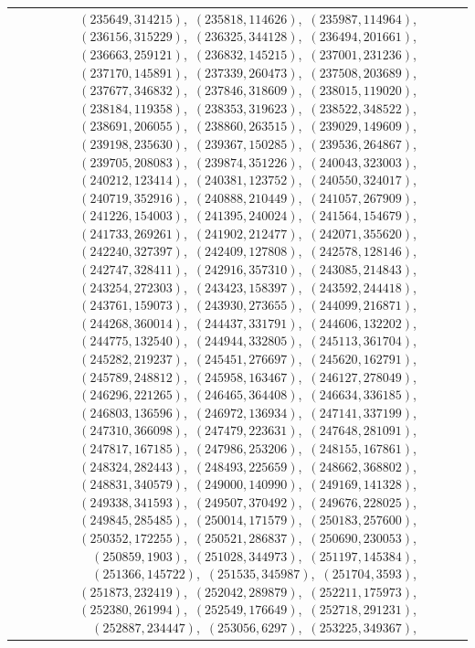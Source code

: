 \documentclass[11pt]{article}
\begin{document}
\begin{longtable}{@{}rrl>{\raggedright\arraybackslash}p{}@{}}
$(235649,314215)$,\allowbreak\ $(235818,114626)$,\allowbreak\ $(235987,114964)$,\allowbreak\ $(236156,315229)$,\allowbreak\ $(236325,344128)$,\allowbreak\ $(236494,201661)$,\allowbreak\ $(236663,259121)$,\allowbreak\ $(236832,145215)$,\allowbreak\ $(237001,231236)$,\allowbreak\ $(237170,145891)$,\allowbreak\ $(237339,260473)$,\allowbreak\ $(237508,203689)$,\allowbreak\ $(237677,346832)$,\allowbreak\ $(237846,318609)$,\allowbreak\ $(238015,119020)$,\allowbreak\ $(238184,119358)$,\allowbreak\ $(238353,319623)$,\allowbreak\ $(238522,348522)$,\allowbreak\ $(238691,206055)$,\allowbreak\ $(238860,263515)$,\allowbreak\ $(239029,149609)$,\allowbreak\ $(239198,235630)$,\allowbreak\ $(239367,150285)$,\allowbreak\ $(239536,264867)$,\allowbreak\ $(239705,208083)$,\allowbreak\ $(239874,351226)$,\allowbreak\ $(240043,323003)$,\allowbreak\ $(240212,123414)$,\allowbreak\ $(240381,123752)$,\allowbreak\ $(240550,324017)$,\allowbreak\ $(240719,352916)$,\allowbreak\ $(240888,210449)$,\allowbreak\ $(241057,267909)$,\allowbreak\ $(241226,154003)$,\allowbreak\ $(241395,240024)$,\allowbreak\ $(241564,154679)$,\allowbreak\ $(241733,269261)$,\allowbreak\ $(241902,212477)$,\allowbreak\ $(242071,355620)$,\allowbreak\ $(242240,327397)$,\allowbreak\ $(242409,127808)$,\allowbreak\ $(242578,128146)$,\allowbreak\ $(242747,328411)$,\allowbreak\ $(242916,357310)$,\allowbreak\ $(243085,214843)$,\allowbreak\ $(243254,272303)$,\allowbreak\ $(243423,158397)$,\allowbreak\ $(243592,244418)$,\allowbreak\ $(243761,159073)$,\allowbreak\ $(243930,273655)$,\allowbreak\ $(244099,216871)$,\allowbreak\ $(244268,360014)$,\allowbreak\ $(244437,331791)$,\allowbreak\ $(244606,132202)$,\allowbreak\ $(244775,132540)$,\allowbreak\ $(244944,332805)$,\allowbreak\ $(245113,361704)$,\allowbreak\ $(245282,219237)$,\allowbreak\ $(245451,276697)$,\allowbreak\ $(245620,162791)$,\allowbreak\ $(245789,248812)$,\allowbreak\ $(245958,163467)$,\allowbreak\ $(246127,278049)$,\allowbreak\ $(246296,221265)$,\allowbreak\ $(246465,364408)$,\allowbreak\ $(246634,336185)$,\allowbreak\ $(246803,136596)$,\allowbreak\ $(246972,136934)$,\allowbreak\ $(247141,337199)$,\allowbreak\ $(247310,366098)$,\allowbreak\ $(247479,223631)$,\allowbreak\ $(247648,281091)$,\allowbreak\ $(247817,167185)$,\allowbreak\ $(247986,253206)$,\allowbreak\ $(248155,167861)$,\allowbreak\ $(248324,282443)$,\allowbreak\ $(248493,225659)$,\allowbreak\ $(248662,368802)$,\allowbreak\ $(248831,340579)$,\allowbreak\ $(249000,140990)$,\allowbreak\ $(249169,141328)$,\allowbreak\ $(249338,341593)$,\allowbreak\ $(249507,370492)$,\allowbreak\ $(249676,228025)$,\allowbreak\ $(249845,285485)$,\allowbreak\ $(250014,171579)$,\allowbreak\ $(250183,257600)$,\allowbreak\ $(250352,172255)$,\allowbreak\ $(250521,286837)$,\allowbreak\ $(250690,230053)$,\allowbreak\ $(250859,1903)$,\allowbreak\ $(251028,344973)$,\allowbreak\ $(251197,145384)$,\allowbreak\ $(251366,145722)$,\allowbreak\ $(251535,345987)$,\allowbreak\ $(251704,3593)$,\allowbreak\ $(251873,232419)$,\allowbreak\ $(252042,289879)$,\allowbreak\ $(252211,175973)$,\allowbreak\ $(252380,261994)$,\allowbreak\ $(252549,176649)$,\allowbreak\ $(252718,291231)$,\allowbreak\ $(252887,234447)$,\allowbreak\ $(253056,6297)$,\allowbreak\ $(253225,349367)$,\allowbreak\ 
\end{longtable}
\end{document}

